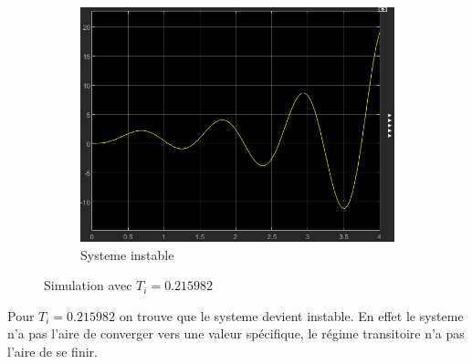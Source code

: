 \documentclass[12pt, a4paper]{report}
\begin{document}
\begin{figure}[H]
    \centering
    \begin{subfigure}[h]{0.6\linewidth}
        \includegraphics[width=\linewidth]{sim2ti4.png}
        \caption{Systeme instable}
    \end{subfigure}
    \caption{Simulation avec $T_i = 0.215982$}
    \label{fig:sim2KTi4}
\end{figure}

Pour $T_i = 0.215982$ on trouve que le systeme devient instable. En effet le systeme n'a pas l'aire de converger vers une valeur 
spécifique, le régime transitoire n'a pas l'aire de se finir. 
\end{document}
